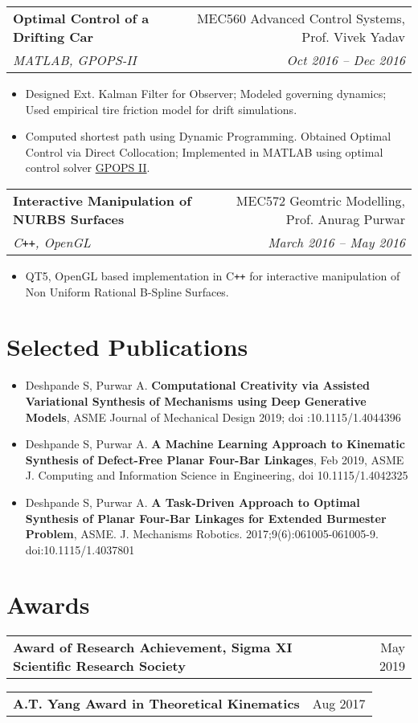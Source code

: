 \documentclass[letterpaper,10pt]{article}
\makeatletter
\newcommand{\resumeHeading}[4]{
  \vspace{-1pt}
    \begin{tabular*}{0.97\textwidth}{l@{\extracolsep{\fill}}r}
      \textbf{#1} & #2 \vspace{-2pt}\\ \vspace{1pt}
      \textit{\small#3} & \textit{\small #4} \\
    \end{tabular*}
}
\newcommand{\resumeSubheadingWithDate}[2]{
    \begin{tabular*}{0.97\textwidth}{l@{\extracolsep{\fill}}r}
      \small\textbf{#1} & \small #2 \\
    \end{tabular*}
    \vspace{+2pt}
}
\newcommand{\resumeSection}[1]{
\vspace{-12pt}
\section{\textbf{#1}}
}
\newcommand{\resumeItemListStart}{
\vspace{-7pt}
\begin{itemize}[leftmargin=14pt]
}
\newcommand{\resumeItemListEnd}{
\vspace{+7pt}
\end{itemize}
}
\newcommand{\resumeItem}[1]{
  \item\small{
      {#1 \vspace{-7pt}
      }
  }
}
\makeatother
\begin{document}
    \resumeHeading{Optimal Control of a Drifting Car}{MEC560 Advanced Control Systems, Prof. Vivek Yadav}{MATLAB, GPOPS-II}{Oct 2016 -- Dec 2016}
    \resumeItemListStart
      \resumeItem{Designed Ext. Kalman Filter for Observer; Modeled governing dynamics; Used empirical tire friction model for drift simulations.}
      \resumeItem{Computed shortest path using Dynamic Programming. Obtained Optimal Control via Direct Collocation; Implemented in MATLAB using optimal control solver \href{http://www.gpops2.com/}{GPOPS II}.}
    \resumeItemListEnd


    \vspace{-2pt}
    \resumeHeading{Interactive Manipulation of NURBS Surfaces}{MEC572 Geomtric Modelling, Prof. Anurag Purwar}{C\texttt{++}, OpenGL}{March 2016 -- May 2016}
    \resumeItemListStart
      \resumeItem{QT5, OpenGL based implementation in C\texttt{++} for interactive manipulation of Non Uniform Rational B-Spline Surfaces.}
    \resumeItemListEnd

\resumeSection{Selected Publications}
\vspace{+7pt}
    \resumeItemListStart
      \resumeItem{Deshpande S, Purwar A. \textbf{Computational Creativity via Assisted Variational Synthesis of Mechanisms using Deep Generative Models}, ASME Journal of Mechanical Design 2019; doi :10.1115/1.4044396}
      \resumeItem{Deshpande S, Purwar A. \textbf{A Machine Learning Approach to Kinematic Synthesis of Defect-Free Planar Four-Bar Linkages}, Feb 2019, ASME J. Computing and Information Science in Engineering, doi 10.1115/1.4042325}
      \resumeItem{Deshpande S, Purwar A. \textbf{A Task-Driven Approach to Optimal Synthesis of Planar Four-Bar Linkages for Extended Burmester Problem}, ASME. J. Mechanisms Robotics. 2017;9(6):061005-061005-9. doi:10.1115/1.4037801}
    \resumeItemListEnd

\resumeSection{Awards}
    \resumeSubheadingWithDate{Award of Research Achievement, Sigma XI Scientific Research Society}{May 2019}
    \resumeSubheadingWithDate{A.T. Yang Award in Theoretical Kinematics}{Aug 2017}
\end{document}
